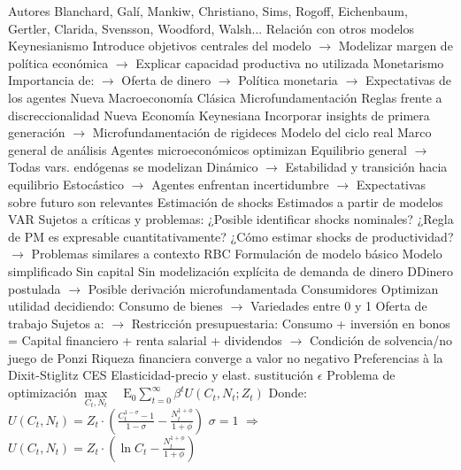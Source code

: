 \documentclass{nuevotema}
\begin{document}
\begin{esquemal}
			\3 Autores
				\4[] Blanchard, Galí, Mankiw, Christiano, Sims,
				\4[] Rogoff, Eichenbaum, Gertler, Clarida,
				\4[] Svensson, Woodford, Walsh...
			\3 Relación con otros modelos
				\4 Keynesianismo
				\4[] Introduce objetivos centrales del modelo
				\4[] $\to$ Modelizar margen de política económica
				\4[] $\to$ Explicar capacidad productiva no utilizada
				\4 Monetarismo
				\4[] Importancia de:
				\4[] $\to$ Oferta de dinero
				\4[] $\to$ Política monetaria
				\4[] $\to$ Expectativas de los agentes
				\4 Nueva Macroeconomía Clásica
				\4[] Microfundamentación
				\4[] Reglas frente a discreccionalidad
				\4 Nueva Economía Keynesiana
				\4[] Incorporar insights de primera generación
				\4[] $\to$ Microfundamentación de rigideces
				\4 Modelo del ciclo real
				\4[] Marco general de análisis
				\4[] Agentes microeconómicos optimizan
				\4[] Equilibrio general
				\4[] $\to$ Todas vars. endógenas se modelizan
				\4[] Dinámico
				\4[] $\to$ Estabilidad y transición hacia equilibrio
				\4[] Estocástico
				\4[] $\to$ Agentes enfrentan incertidumbre
				\4[] $\to$ Expectativas sobre futuro son relevantes
			\3 Estimación de shocks
				\4 Estimados a partir de modelos VAR
				\4 Sujetos a críticas y problemas:
				\4[] ¿Posible identificar shocks nominales?
				\4[] ¿Regla de PM es expresable cuantitativamente?
				\4[] ¿Cómo estimar shocks de productividad?
				\4[] $\to$ Problemas similares a contexto RBC
		\2 Formulación de modelo básico
			\3 Modelo simplificado
				\4 Sin capital
				\4 Sin modelización explícita de demanda de dinero
				\4[] DDinero postulada
				\4[] $\to$ Posible derivación microfundamentada
			\3 Consumidores
				\4 Optimizan utilidad decidiendo:
				\4[] Consumo de bienes
				\4[] $\to$ Variedades entre 0 y 1
				\4[] Oferta de trabajo
				\4 Sujetos a:
				\4[] $\to$ Restricción presupuestaria:
				\4[] Consumo + inversión en bonos
				\4[] =
				\4[] Capital financiero + renta salarial + dividendos
				\4[] $\to$ Condición de solvencia/no juego de Ponzi
				\4[] Riqueza financiera converge a valor no negativo
				\4 Preferencias à la Dixit-Stiglitz
				\4[] CES
				\4[] Elasticidad-precio y elast. sustitución $\epsilon$
				\4 Problema de optimización
				\4[] $\underset{C_t, N_t}{\max} \quad \text{E}_0 \sum_{t=0}^\infty \beta^t U(C_t, N_t; Z_t)$
				\4[] Donde:
				\4[] \quad \quad \quad $U(C_t, N_t) = Z_t \cdot \left( \frac{C_t^{1-\sigma} - 1}{1 - \sigma} - \frac{N_t^{1+\phi}}{1+\phi} \right)$
				\4[] \quad \quad \quad $\sigma=1$ $\Rightarrow$ $U(C_t, N_t) = Z_t \cdot \left( \ln C_t - \frac{N_t^{1+\phi}}{1+\phi} \right)$

\end{esquemal}
\end{document}
